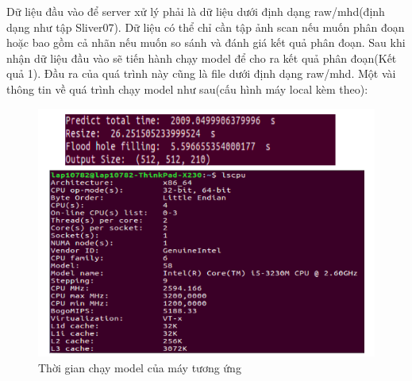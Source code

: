 Dữ liệu đầu vào để server xử lý phải là dữ liệu dưới định dạng raw/mhd(định dạng như tập Sliver07). Dữ liệu có thể chỉ cần tập ảnh scan nếu muốn phân đoạn hoặc bao gồm cả nhãn nếu muốn so sánh và đánh giá kết quả phân đoạn.
Sau khi nhận dữ liệu đầu vào sẽ tiến hành chạy model để cho ra kết quả phân đoạn(Kết quả 1). Đầu ra của quá trình này cũng là file dưới định dạng raw/mhd. Một vài thông tin về quá trình chạy model như sau(cấu hình máy local kèm theo):
\begin{figure}[h]
\centering
    \includegraphics[totalheight=7cm]{Images/app_localinfor.png}
    \caption{Thời gian chạy model của máy tương ứng}
    \label{skip_conn}
\end{figure}
